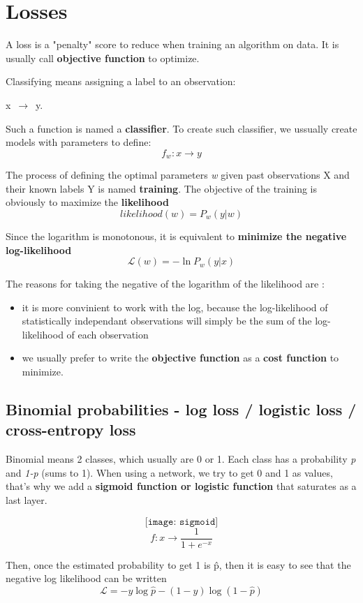 \documentclass{report}
\begin{document}
\chapter {Losses}
A loss is a "penalty" score to reduce when training an algorithm on data. It is usually call \textbf{objective function} to
optimize.

Classifying means assigning a label to an observation:

x $\, \to \,$ y.

Such a function is named a \textbf{classifier}. To create such classifier, we ussually create models with parameters to define:
\[ f_w  : x \to y \]

The process of defining the optimal parameters \textit{w} given past observations X and their known labels Y is named \textbf{training}.
The objective of the training is obviously to maximize the \textbf{likelihood}
\[ likelihood(w) = P_w(y|w) \]

Since the logarithm is monotonous, it is equivalent to \textbf{minimize the negative log-likelihood}
\[ \mathscr{L}( w ) = - \ln P_w( y | x ) \]

The reasons for taking the negative of the logarithm of the likelihood are :
\begin{itemize}
\item it is more convinient to work with the log, because the log-likelihood of statistically independant observations will
  simply be the sum of the log-likelihood of each observation
\item we usually prefer to write the \textbf{objective function} as a \textbf{cost function} to minimize.
\end{itemize}

\section {Binomial probabilities - log loss / logistic loss / cross-entropy loss}

Binomial means 2 classes, which usually are 0 or 1. Each class has a probability \textit{p} and \textit{1-p} (sums to 1).
When using a network, we try to get 0 and 1 as values, that's why we add a \textbf{sigmoid function or logistic function} that saturates
as a last layer.


\[  \texttt{[image: sigmoid]} \]
\[ f:  x \rightarrow \frac{1}{ 1 + e^{-x}} \]

Then, once the estimated probability to get 1 is \^{p}, then it is easy to see that the negative log likelihood can be written
\[ \mathscr{L} = - y \log \hat{p}  - (1 - y) \log ( 1 - \hat{p} ) \]
\end{document}
